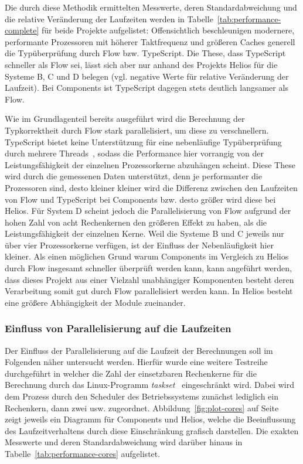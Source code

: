 Die durch diese Methodik ermittelten Messwerte, deren Standardabweichung und die relative Veränderung der Laufzeiten werden in Tabelle~\ref{tab:performance-complete} für beide Projekte aufgelistet: Offensichtlich beschleunigen modernere, performante Prozessoren mit höherer Taktfrequenz und größeren Caches generell die Typüberprüfung durch Flow bzw. TypeScript. Die These, dass TypeScript schneller als Flow sei, lässt sich aber nur anhand des Projekts Helios für die Systeme B, C und D belegen (vgl. negative Werte für relative Veränderung der Laufzeit). Bei Components ist TypeScript dagegen stets deutlich langsamer als Flow.

\medbreak


Wie im Grundlagenteil bereits ausgeführt wird die Berechnung der Typkorrektheit durch Flow stark parallelisiert, um diese zu verschnellern. TypeScript bietet keine Unterstützung für eine nebenläufige Typüberprüfung durch mehrere Threads~\autocite{TS:NO_MULTICORE}, sodass die Performance hier vorrangig von der Leistungsfähigkeit der einzelnen Prozessorkerne abzuhängen scheint. Diese These wird durch die gemessenen Daten unterstützt, denn je performanter die Prozessoren sind, desto kleiner kleiner wird die Differenz zwischen den Laufzeiten von Flow und TypeScript bei Components bzw. desto größer wird diese bei Helios.
Für System D scheint jedoch die Parallelisierung von Flow aufgrund der hohen Zahl von acht Rechenkernen den größeren Effekt zu haben, als die Leistungsfähigkeit der einzelnen Kerne. Weil die Systeme B und C jeweils nur über vier Prozessorkerne verfügen, ist der Einfluss der Nebenläufigkeit hier kleiner. Als einen möglichen Grund warum Components im Vergleich zu Helios durch Flow insgesamt schneller überprüft werden kann, kann angeführt werden, dass dieses Projekt aus einer Vielzahl unabhängiger Komponenten besteht deren Verarbeitung somit gut durch Flow parallelisiert werden kann. In Helios besteht eine größere Abhängigkeit der Module zueinander.

\subsubsection{Einfluss von Parallelisierung auf die Laufzeiten}

Der Einfluss der Parallelisierung auf die Laufzeit der Berechnungen soll im Folgenden näher untersucht werden. Hierfür wurde eine weitere Testreihe durchgeführt in welcher die Zahl der einsetzbaren Rechenkerne für die Berechnung durch das Linux-Programm \textit{taskset}~\autocite{TASKSET} eingeschränkt wird. Dabei wird dem Prozess durch den Scheduler des Betriebssystems zunächst lediglich ein Rechenkern, dann zwei usw. zugeordnet. Abbildung~\ref{fig:plot-cores} auf Seite~\pageref{fig:plot-cores} zeigt jeweils ein Diagramm für Components und Helios, welche die Beeinflussung des Laufzeitverhaltens durch diese Einschränkung grafisch darstellen. Die exakten Messwerte und deren Standardabweichung wird darüber hinaus in Tabelle~\ref{tab:performance-cores} aufgelistet.

